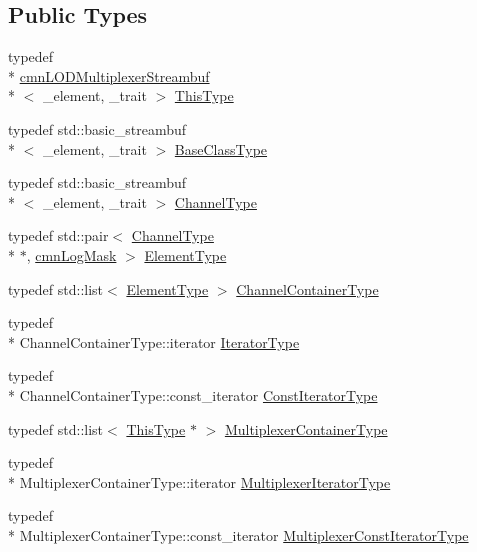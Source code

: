 \subsection*{Public Types}
\begin{DoxyCompactItemize}
\item 
typedef \\*
\hyperlink{classcmn_l_o_d_multiplexer_streambuf}{cmn\-L\-O\-D\-Multiplexer\-Streambuf}\\*
$<$ \-\_\-element, \-\_\-trait $>$ \hyperlink{classcmn_l_o_d_multiplexer_streambuf_aa50efd43cb53bb6be746e3990e02452a}{This\-Type}
\item 
typedef std\-::basic\-\_\-streambuf\\*
$<$ \-\_\-element, \-\_\-trait $>$ \hyperlink{classcmn_l_o_d_multiplexer_streambuf_acd1cdcc6f9f1607317e5ec459b67da37}{Base\-Class\-Type}
\item 
typedef std\-::basic\-\_\-streambuf\\*
$<$ \-\_\-element, \-\_\-trait $>$ \hyperlink{classcmn_l_o_d_multiplexer_streambuf_aa3b0347701c1aa5157a719978a1a6386}{Channel\-Type}
\item 
typedef std\-::pair$<$ \hyperlink{classcmn_l_o_d_multiplexer_streambuf_aa3b0347701c1aa5157a719978a1a6386}{Channel\-Type} \\*
$\ast$, \hyperlink{cmn_log_lo_d_8h_a44b6ef7560b0d204460b0a54f1a5d702}{cmn\-Log\-Mask} $>$ \hyperlink{classcmn_l_o_d_multiplexer_streambuf_ac397e28a9605093b41ec53ac52eefef5}{Element\-Type}
\item 
typedef std\-::list$<$ \hyperlink{classcmn_l_o_d_multiplexer_streambuf_ac397e28a9605093b41ec53ac52eefef5}{Element\-Type} $>$ \hyperlink{classcmn_l_o_d_multiplexer_streambuf_a2fd9fe59de3be9b8cf5546ac2b0e41bb}{Channel\-Container\-Type}
\item 
typedef \\*
Channel\-Container\-Type\-::iterator \hyperlink{classcmn_l_o_d_multiplexer_streambuf_a32236d21fe0e9a13f4bea6ed743b0613}{Iterator\-Type}
\item 
typedef \\*
Channel\-Container\-Type\-::const\-\_\-iterator \hyperlink{classcmn_l_o_d_multiplexer_streambuf_ad60c91a0708ddcaf266d48f09d37bb63}{Const\-Iterator\-Type}
\item 
typedef std\-::list$<$ \hyperlink{classcmn_l_o_d_multiplexer_streambuf_aa50efd43cb53bb6be746e3990e02452a}{This\-Type} $\ast$ $>$ \hyperlink{classcmn_l_o_d_multiplexer_streambuf_abddd0ebc7e720ea977f857c6350dd5a0}{Multiplexer\-Container\-Type}
\item 
typedef \\*
Multiplexer\-Container\-Type\-::iterator \hyperlink{classcmn_l_o_d_multiplexer_streambuf_addfaa1fedcd4e3b6df8e4020ec2cbde3}{Multiplexer\-Iterator\-Type}
\item 
typedef \\*
Multiplexer\-Container\-Type\-::const\-\_\-iterator \hyperlink{classcmn_l_o_d_multiplexer_streambuf_a8c5b7460b364a24c760c4acaa6d6f042}{Multiplexer\-Const\-Iterator\-Type}
\end{DoxyCompactItemize}
